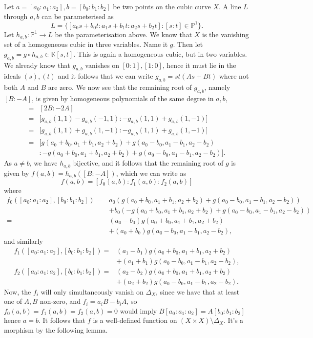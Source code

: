 \documentclass{article}
\theoremstyle{definition}
\newcommand{\K}{\mathbb{K}}
\renewcommand{\P}{\mathbb{P}}
\newcommand{\PP}[1]{\P^{#1}}
\begin{document}
Let $a = [a_0 : a_1 : a_2], b = [b_0 : b_1 : b_2]$ be two points
on the cubic curve $X$. A line $L$ through $a, b$ can be parameterised 
as 
\[
	L = \{ [a_0 s + b_0 t : a_1 s + b_1 t : a_2 s + b_2 t] : [s : t] \in \PP{1} \}.
\] 
Let $h_{a, b} : \PP{1} \to L$ be the parameterisation above. We know that $X$
is the vanishing set of a homogeneous cubic in three variables. Name it $g$.
Then let $g_{a, b} = g \circ h_{a, b} \in \K[s, t]$. This is again a
homogeneous cubic, but in two variables. We already know that $g_{a, b}$
vanishes on $[0 : 1], [1 : 0]$, hence it must lie in the ideals $(s), (t)$ and
it follows that we can write $g_{a, b} = st(As + Bt)$ where not both $A$ and
$B$ are zero. We now see that the remaining root of $g_{a, b}$, namely $[B :
-A]$, is given by homogeneous polynomials of the same degree in $a, b$,
\begin{align*}
	[B:-A]
	=&
	[2B : -2A] \\
	=&
	[g_{a, b}(1, 1) - g_{a, b}(-1, 1) : -g_{a, b}(1, 1) + g_{a, b}(1, -1)\big] \\
	=&
	[g_{a, b}(1, 1) + g_{a, b}(1, -1) : -g_{a, b}(1, 1) + g_{a, b}(1, -1)\big] \\
	=& 
	[g(a_0 + b_0, a_1 + b_1, a_2 + b_2) + g(a_0 - b_0, a_1 - b_1, a_2 - b_2) \\
	 &: -g(a_0 + b_0, a_1 + b_1, a_2 + b_2) + g(a_0 - b_0, a_1 - b_1, a_2 - b_2)].
\end{align*} 
As $a \not = b$, we have $h_{a, b}$ bijective, and it follows that the
remaining root of $g$ is given by $f(a, b) = h_{a, b}([B:-A])$, which we can
write as
\[
	f(a, b) = [f_0(a, b) : f_1(a, b) : f_2(a, b)]
\]
where
\begin{align*}
	f_0([a_0 : a_1 : a_2], [b_0 : b_1 : b_2])
	=& 
		a_0 (g(a_0 + b_0, a_1 + b_1, a_2 + b_2) + g(a_0 - b_0, a_1 - b_1, a_2 - b_2)) \\
	 &+ b_0 (-g(a_0 + b_0, a_1 + b_1, a_2 + b_2) + g(a_0 - b_0, a_1 - b_1, a_2 - b_2)) \\
	=& 
		(a_0 - b_0) g(a_0 + b_0, a_1 + b_1, a_2 + b_2) \\
	 &+ (a_0 + b_0) g(a_0 - b_0, a_1 - b_1, a_2 - b_2),
\end{align*}
and similarly
\begin{align*}
	f_1([a_0 : a_1 : a_2], [b_0 : b_1 : b_2])
	=& 
		(a_1 - b_1) g(a_0 + b_0, a_1 + b_1, a_2 + b_2) \\
	 &+ (a_1 + b_1) g(a_0 - b_0, a_1 - b_1, a_2 - b_2), \\
	f_2([a_0 : a_1 : a_2], [b_0 : b_1 : b_2])
	=& 
		(a_2 - b_2) g(a_0 + b_0, a_1 + b_1, a_2 + b_2) \\
	 &+ (a_2 + b_2) g(a_0 - b_0, a_1 - b_1, a_2 - b_2).
\end{align*}
Now, the $f_i$ will only simultaneously vanish on $\Delta_X$, since we have
that at least one of $A, B$ non-zero, and $f_i = a_i B - b_i A$, so $f_0(a, b) =
f_1(a, b) = f_2(a, b) = 0$ would imply $B [a_0 : a_1 : a_2] = A [b_0 : b_1 :
b_2]$ hence $a = b$. It follows that $f$ is a well-defined function on $(X
\times X) \setminus \Delta_X$. It's a morphism by the following lemma.
\end{document}
